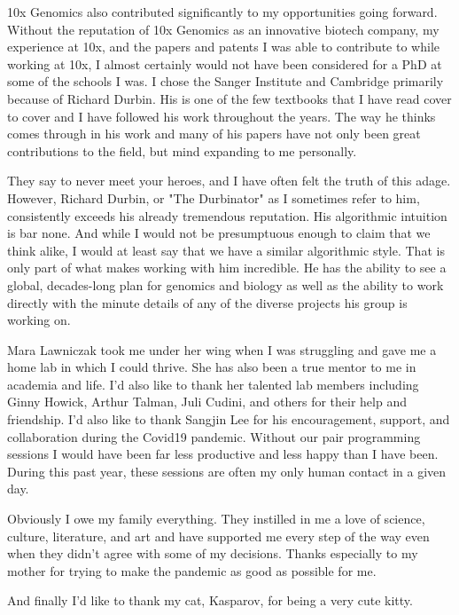 \begin{acknowledgements}
10x Genomics also contributed significantly to my opportunities going forward. Without the reputation of 10x Genomics as an innovative biotech company, my experience at 10x, and the papers and patents I was able to contribute to while working at 10x, I almost certainly would not have been considered for a PhD at some of the schools I was. I chose the Sanger Institute and Cambridge primarily because of Richard Durbin. His is one of the few textbooks that I have read cover to cover and I have followed his work throughout the years. The way he thinks comes through in his work and many of his papers have not only been great contributions to the field, but mind expanding to me personally. 

They say to never meet your heroes, and I have often felt the truth of this adage. However, Richard Durbin, or "The Durbinator" as I sometimes refer to him, consistently exceeds his already tremendous reputation. His algorithmic intuition is bar none. And while I would not be presumptuous enough to claim that we think alike, I would at least say that we have a similar algorithmic style. That is only part of what makes working with him incredible. He has the ability to see a global, decades-long plan for genomics and biology as well as the ability to work directly with the minute details of any of the diverse projects his group is working on.

Mara Lawniczak took me under her wing when I was struggling and gave me a home lab in which I could thrive. She has also been a true mentor to me in academia and life. I'd also like to thank her talented lab members including Ginny Howick, Arthur Talman, Juli Cudini, and others for their help and friendship. I'd also like to thank Sangjin Lee for his encouragement, support, and collaboration during the Covid19 pandemic. Without our pair programming sessions I would have been far less productive and less happy than I have been. During this past year, these sessions are often my only human contact in a given day. 

Obviously I owe my family everything. They instilled in me a love of science, culture, literature, and art and have supported me every step of the way even when they didn't agree with some of my decisions. Thanks especially to my mother for trying to make the pandemic as good as possible for me.

And finally I'd like to thank my cat, Kasparov, for being a very cute kitty.












\end{acknowledgements}
